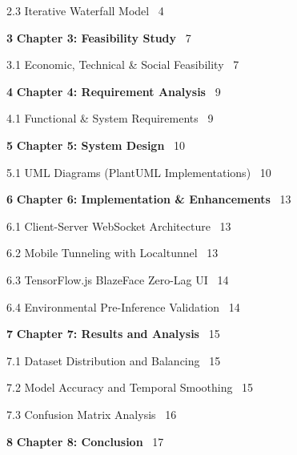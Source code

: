 \documentclass[12pt,a4paper]{report}
\begin{document}
\hspace{1.2cm}2.3 \quad Iterative Waterfall Model \dotfill\ 4

\bigskip

\noindent \textbf{3} \quad \textbf{Chapter 3: Feasibility Study} \dotfill\ 7

\hspace{1.2cm}3.1 \quad Economic, Technical \& Social Feasibility \dotfill\ 7

\bigskip

\noindent \textbf{4} \quad \textbf{Chapter 4: Requirement Analysis} \dotfill\ 9

\hspace{1.2cm}4.1 \quad Functional \& System Requirements \dotfill\ 9

\bigskip

\noindent \textbf{5} \quad \textbf{Chapter 5: System Design} \dotfill\ 10

\hspace{1.2cm}5.1 \quad UML Diagrams (PlantUML Implementations) \dotfill\ 10

\bigskip

\noindent \textbf{6} \quad \textbf{Chapter 6: Implementation \& Enhancements} \dotfill\ 13

\hspace{1.2cm}6.1 \quad Client-Server WebSocket Architecture \dotfill\ 13

\hspace{1.2cm}6.2 \quad Mobile Tunneling with Localtunnel \dotfill\ 13

\hspace{1.2cm}6.3 \quad TensorFlow.js BlazeFace Zero-Lag UI \dotfill\ 14

\hspace{1.2cm}6.4 \quad Environmental Pre-Inference Validation \dotfill\ 14

\bigskip

\noindent \textbf{7} \quad \textbf{Chapter 7: Results and Analysis} \dotfill\ 15

\hspace{1.2cm}7.1 \quad Dataset Distribution and Balancing \dotfill\ 15

\hspace{1.2cm}7.2 \quad Model Accuracy and Temporal Smoothing \dotfill\ 15

\hspace{1.2cm}7.3 \quad Confusion Matrix Analysis \dotfill\ 16

\bigskip

\noindent \textbf{8} \quad \textbf{Chapter 8: Conclusion} \dotfill\ 17
\end{document}

